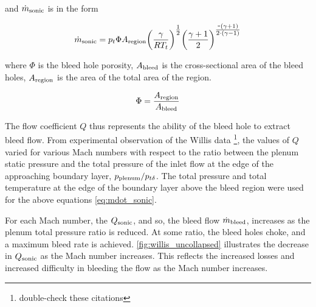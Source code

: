 and $\dot{m}_{\textrm{sonic}}$ is in the form


\begin{equation} \dot{m}_{\textrm{sonic}} = p_t \Phi A_{\textrm{region}} \qty(\frac{\gamma}{RT_t})^{\textstyle\frac{1}{2}} \qty(\frac{\gamma+1}{2})^{\textstyle\frac{\texttt{-}\qty(\gamma+1)}{2\cdot\qty(\gamma-1)}} 
\label{eq:mdot_sonic}
\end{equation}

where $\Phi$ is the bleed hole porosity, $A_{\textrm{bleed}}$ is the cross-sectional area of the bleed holes, $A_{\textrm{region}}$ is the area of the total area of the region.

$$ \Phi = \frac{A_{\textrm{region}}}{A_{\textrm{bleed}}} $$




The flow coefficient $Q$ thus represents the ability of the bleed hole to extract bleed flow. From experimental observation of the Willis data \cite{Willis1995,Willis1996}\footnote{double-check these citations}, %
the values of $Q$ varied for various Mach numbers with respect to the ratio between the plenum static pressure and the total pressure of the inlet flow at the edge of the approaching boundary layer, $p_{\textrm{plenum}}/p_{t\delta}$. The total pressure and total temperature at the edge of the boundary layer above the bleed region were used for the above equations \cref{eq:mdot_sonic}.


For each Mach number, the $Q_{\textrm{sonic}}$, and so, the bleed flow $\dot{m}_{\textrm{bleed}}$, increases as the plenum total pressure ratio is reduced. At some ratio, the bleed holes choke, and a maximum bleed rate is achieved. \cref{fig:willis_uncollapsed} illustrates the decrease in $Q_{\textrm{sonic}}$ as the Mach number increases. This reflects the increased losses and increased difficulty in bleeding the flow as the Mach number increases.

